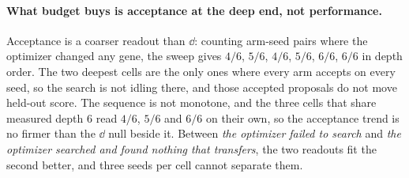 \documentclass[11pt]{article}
\begin{document}
\paragraph{What budget buys is acceptance at the deep end, not performance.} Acceptance is a
coarser readout than $\dd$: counting arm-seed pairs where the optimizer changed any gene, the
sweep gives $4/6$, $5/6$, $4/6$, $5/6$, $6/6$, $6/6$ in depth order. The two deepest cells are the
only ones where every arm accepts on every seed, so the search is not idling there, and those
accepted proposals do not move held-out score. The sequence is not monotone, and the three cells
that share measured depth $6$ read $4/6$, $5/6$ and $6/6$ on their own, so the acceptance trend is
no firmer than the $\dd$ null beside it. Between \emph{the optimizer failed to search} and
\emph{the optimizer searched and found nothing that transfers}, the two readouts fit the second
better, and three seeds per cell cannot separate them.
\end{document}
